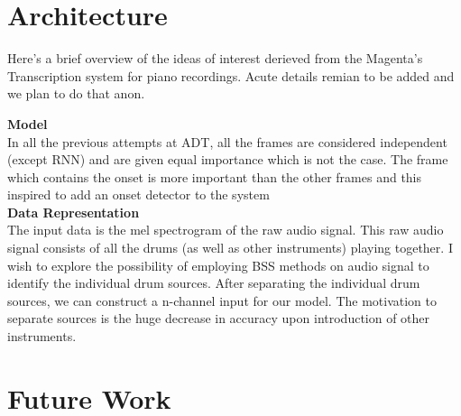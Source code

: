 \chapter{Architecture}

Here's a brief overview of the ideas of interest derieved from the Magenta's Transcription system for piano recordings. Acute details remian to be added and we plan to do that anon. 

\textbf{Model} \\ 
In all the previous attempts at ADT, all the frames are considered independent (except RNN) and are given equal importance which is not the case. The frame which contains the onset is more important than the other frames and this inspired to add an onset detector to the system \\ 


\textbf{Data Representation} \\ 
The input data is the mel spectrogram of the raw audio signal. This raw audio signal consists of all the drums (as well as other instruments) playing together. I wish to explore the possibility of employing BSS methods on audio signal to identify the individual drum sources. 
After separating the individual drum sources, we can construct a n-channel input for our model. 
The motivation to separate sources is the huge decrease in accuracy upon introduction of other instruments. \\ 
\chapter{Future Work}

